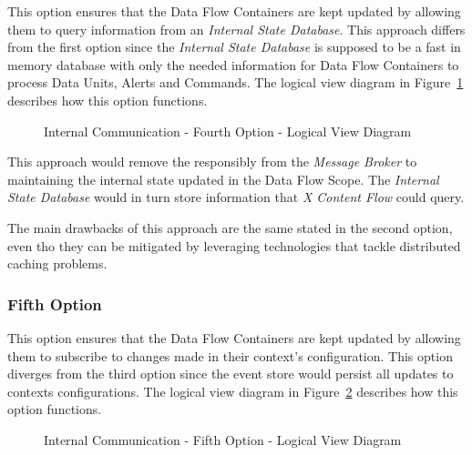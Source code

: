This option ensures that the Data Flow Containers are kept updated by allowing them to query information from an \textit{Internal State Database}. This approach differs from the first option since the \textit{Internal State Database} is supposed to be a fast in memory database with only the needed information for Data Flow Containers to process Data Units, Alerts and Commands. The logical view diagram in Figure~\ref{fig:design:alternatives:internal:fourth:diagram} describes how this option functions.

\begin{figure}[H]
   \centering
   \resizebox{\columnwidth}{!}
   {
      
   }
   \caption[Internal Communication - Fourth Option - Logical View Diagram]{Internal Communication - Fourth Option - Logical View Diagram}
   \label{fig:design:alternatives:internal:fourth:diagram}
\end{figure}

This approach would remove the responsibly from the \textit{Message Broker} to maintaining the internal state updated in the Data Flow Scope.
The \textit{Internal State Database} would in turn store information that \textit{X Content Flow} could query.

The main drawbacks of this approach are the same stated in the second option, even tho they can be mitigated by leveraging technologies that tackle distributed caching problems.

\subsubsection*{Fifth Option}
\label{subsubsec:design:alternatives:internal:fifth}

This option ensures that the Data Flow Containers are kept updated by allowing them to subscribe to changes made in their context's configuration. This option diverges from the third option since the event store would persist all updates to contexts configurations. The logical view diagram in Figure~\ref{fig:design:alternatives:internal:fifth:diagram} describes how this option functions.

\begin{figure}[H]
   \centering
   \resizebox{\columnwidth}{!}
   {
      
   }
   \caption[Internal Communication - Fifth Option - Logical View Diagram]{Internal Communication - Fifth Option - Logical View Diagram}
   \label{fig:design:alternatives:internal:fifth:diagram}
\end{figure}

